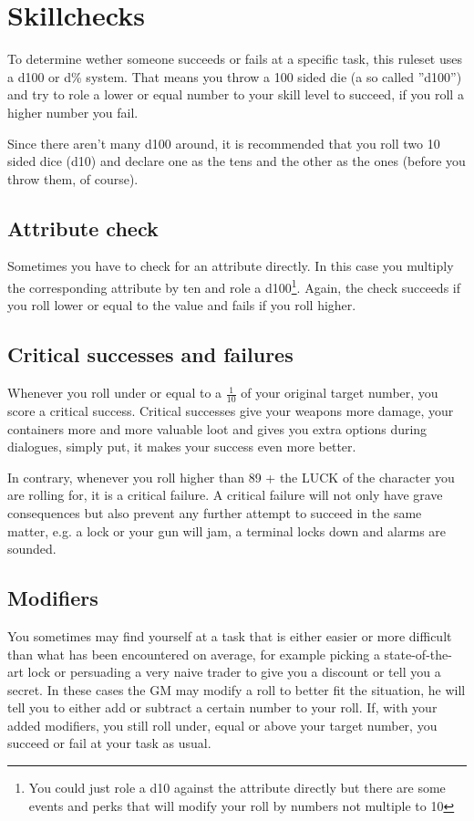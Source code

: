 \section{Skillchecks}
To determine wether someone succeeds or fails at a specific task, this ruleset uses a d100 or d\% system. That means you throw a 100 sided die (a so called ''d100'') and try to role a lower or equal number to your skill level to succeed, if you roll a higher number you fail.

Since there aren't many d100 around, it is recommended that you roll two 10 sided dice (d10) and declare one as the tens and the other as the ones (before you throw them, of course).
\subsection{Attribute check}
Sometimes you have to check for an attribute directly. In this case you multiply the corresponding attribute by ten and role a d100\footnote{You could just role a d10 against the attribute directly but there are some events and perks that will modify your roll by numbers not multiple to 10}. Again, the check succeeds if you roll lower or equal to the value and fails if you roll higher.
\subsection{Critical successes and \mbox{failures}}
Whenever you roll under or equal to a $\frac{1}{10}$ of your original target number, you score a critical success. Critical successes give your weapons more damage, your containers more and more valuable loot and gives you extra options during dialogues, simply put, it makes your success even more better.

In contrary, whenever you roll higher than 89 + the LUCK of the character you are rolling for, it is a critical failure. A critical failure will not only have grave consequences but also prevent any further attempt to succeed in the same matter, e.g. a lock or your gun will jam, a terminal locks down and alarms are sounded.
\subsection{Modifiers}
You sometimes may find yourself at a task that is either easier or more difficult than what has been encountered on average, for example picking a state-of-the-art lock or persuading a very naive trader to give you a discount or tell you a secret. In these cases the GM may modify a roll to better fit the situation, he will tell you to either add or subtract a certain number to your roll. If, with your added modifiers, you still roll under, equal or above your target number, you succeed or fail at your task as usual.


